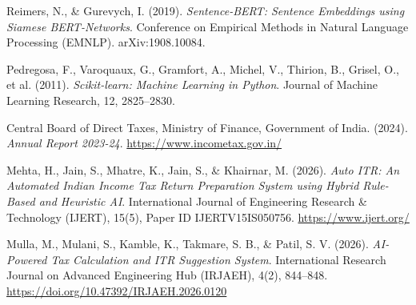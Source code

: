 Reimers, N., \& Gurevych, I. (2019). \textit{Sentence-BERT: Sentence Embeddings
using Siamese BERT-Networks}. Conference on Empirical Methods in Natural Language
Processing (EMNLP). arXiv:1908.10084.

Pedregosa, F., Varoquaux, G., Gramfort, A., Michel, V., Thirion, B., Grisel, O.,
et al. (2011). \textit{Scikit-learn: Machine Learning in Python}. Journal of
Machine Learning Research, 12, 2825--2830.

Central Board of Direct Taxes, Ministry of Finance, Government of India. (2024).
\textit{Annual Report 2023-24}. \url{https://www.incometax.gov.in/}

Mehta, H., Jain, S., Mhatre, K., Jain, S., \& Khairnar, M. (2026). \textit{Auto
ITR: An Automated Indian Income Tax Return Preparation System using Hybrid
Rule-Based and Heuristic AI}. International Journal of Engineering Research \&
Technology (IJERT), 15(5), Paper ID IJERTV15IS050756.
\url{https://www.ijert.org/}

Mulla, M., Mulani, S., Kamble, K., Takmare, S. B., \& Patil, S. V. (2026).
\textit{AI-Powered Tax Calculation and ITR Suggestion System}. International
Research Journal on Advanced Engineering Hub (IRJAEH), 4(2), 844--848.
\url{https://doi.org/10.47392/IRJAEH.2026.0120}
